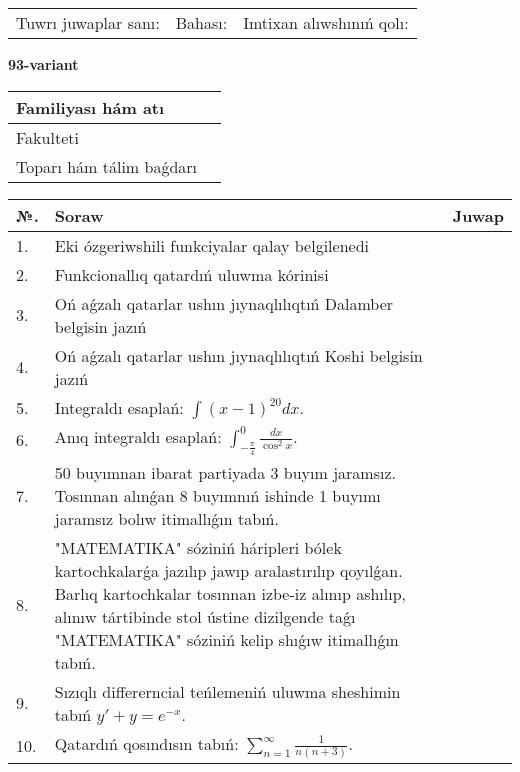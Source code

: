 \documentclass{article}
\begin{document}
\vspace{1cm}

\begin{tabular}{ c c c }
Tuwrı juwaplar sanı: \underline{\hspace{2cm}} & Bahası: \underline{\hspace{2cm}} & Imtixan alıwshınıń qolı: \underline{\hspace{2cm}} \\
\end{tabular}

\newpage

\begin{center}\textbf{93-variant}\end{center}

\bgroup
\def\arraystretch{1.5}
\begin{tabular}{ |m{6cm}|m{10cm}| }
  \hline
  Familiyası hám atı & \\
  \hline
  Fakulteti &\\
  \hline
  Toparı hám tálim baǵdarı & \\
  \hline
\end{tabular}
\egroup

\vspace{0.5cm}

\bgroup
\def\arraystretch{2}
\begin{tabular}{ |l|m{8cm}|m{7cm}| }
  \hline
  №. & Soraw & Juwap \\
  \hline
  1. & Eki ózgeriwshili funkciyalar qalay belgilenedi &  \\
  \hline
  2. & Funkcionallıq qatardıń uluwma kórinisi &  \\
  \hline
  3. & Oń aǵzalı qatarlar ushın jıynaqlılıqtıń Dalamber belgisin jazıń &  \\
  \hline
  4. & Oń aǵzalı qatarlar ushın jıynaqlılıqtıń Koshi belgisin jazıń &  \\
  \hline
  5. & Integraldı esaplań: $\displaystyle\int (x - 1)^{20}dx$. &  \\
  \hline
  6. & Anıq integraldı esaplań: $\displaystyle\int_{-\frac{\pi}{4}}^{0}\frac{dx}{\cos^{2}x}$. &  \\
  \hline
  7. & 50 buyımnan ibarat partiyada 3 buyım jaramsız. Tosınnan alınǵan 8 buyımnıń ishinde 1 buyımı jaramsız bolıw itimallıǵın tabıń. &  \\
  \hline
  8. & "MATEMATIKA" sóziniń háripleri bólek kartochkalarǵa jazılıp jawıp aralastırılıp qoyılǵan. Barlıq kartochkalar tosınnan izbe-iz alınıp ashılıp, alınıw tártibinde stol ústine dizilgende taǵı "MATEMATIKA" sóziniń kelip shıǵıw itimallıǵın tabıń. &  \\
  \hline
  9. & Sızıqlı differerncial teńlemeniń uluwma sheshimin tabıń $y' + y =e^{-x}$. &  \\
  \hline
  10. & Qatardıń qosındısın tabıń: $\displaystyle\sum_{n = 1}^{\infty}\frac{1}{n(n + 3)}$. &  \\
  \hline
\end{tabular}
\egroup
\end{document}
